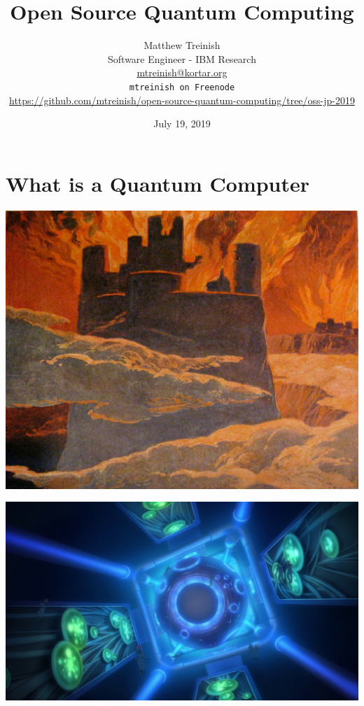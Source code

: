 \documentclass[aspectratio=169,11pt,hyperref={colorlinks=true}]{beamer}
\author[Matthew Treinish]{%
    \texorpdfstring{%
        \centering
        Matthew Treinish\\
        Software Engineer - IBM Research\\
        \href{mailto:mtreinish@kortar.org}{mtreinish@kortar.org}\\
        \texttt{mtreinish on Freenode}\\
        \href{https://github.com/mtreinish/open-source-quantum-computing/tree/oss-jp-2019}{https://github.com/mtreinish/open-source-quantum-computing/tree/oss-jp-2019}
   }
   {Matthew Treinish}
}
\date{July 19, 2019}
\title{Open Source Quantum Computing}
\begin{document}
\titlepage

\section{What is a Quantum Computer}
\begin{frame}
    \includegraphics[width=\textwidth]{Ragnarok.jpg}
\end{frame}

\newcommand{\iu}{{i\mkern1mu}}

\begin{frame}
    \includegraphics[width=\textwidth]{Veda_AD2314.png}
\end{frame}
\end{document}
